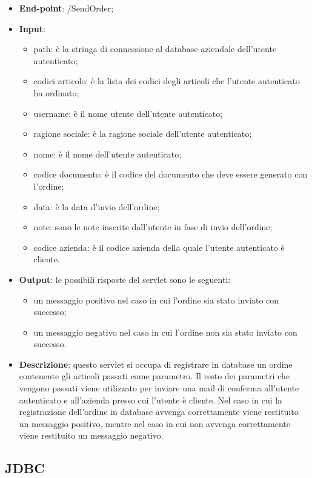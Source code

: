 \begin{itemize}
	\item \textbf{End-point}: /SendOrder;
	\item \textbf{Input}:
		\begin{itemize}
			\item path: è la stringa di connessione al database aziendale dell'utente autenticato;
			\item codici articolo: è la lista dei codici degli articoli che l'utente autenticato ha ordinato;
			\item username: è il nome utente dell'utente autenticato;
			\item ragione sociale: è la ragione sociale dell'utente autenticato;
			\item nome: è il nome dell'utente autenticato;
			\item codice documento: è il codice del documento che deve essere generato con l'ordine;
			\item data: è la data d'invio dell'ordine;
			\item note: sono le note inserite dall'utente in fase di invio dell'ordine;
			\item codice azienda: è il codice azienda della quale l'utente autenticato è cliente.
		\end{itemize}
	\item \textbf{Output}: le possibili risposte del servlet sono le seguenti:
		\begin{itemize}
			\item un messaggio positivo nel caso in cui l'ordine sia stato inviato con successo;
			\item un messaggio negativo nel caso in cui l'ordine non sia stato inviato con successo.
		\end{itemize}
	\item \textbf{Descrizione}: questo servlet si occupa di registrare in database un ordine contenente gli articoli passati come parametro. Il resto dei parametri che vengono passati viene utilizzato per inviare una mail di conferma all'utente autenticato e all'azienda presso cui l'utente è cliente. Nel caso in cui la registrazione dell'ordine in database avvenga correttamente viene restituito un messaggio positivo, mentre nel caso in cui non avvenga correttamente viene restituito un messaggio negativo.
\end{itemize}

\subsection{JDBC}

